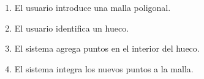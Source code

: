 		\CUNormal
		\begin{enumerate}
			\item El usuario introduce una malla poligonal.
			\item El usuario identifica un hueco. 
			\item El sistema agrega puntos en el interior del hueco.
			\item El sistema integra los nuevos puntos a la malla.
		\end{enumerate}
